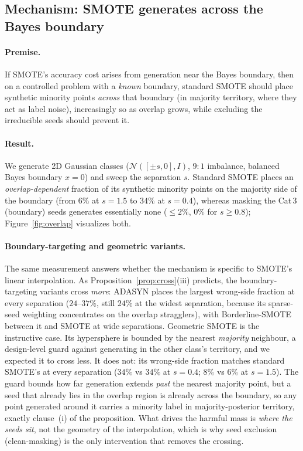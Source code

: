 \subsection{Mechanism: SMOTE generates across the Bayes boundary}\label{sec:results:mechanism}

\paragraph{Premise.} If SMOTE's accuracy cost arises from generation near the
Bayes boundary, then on a controlled problem with a \emph{known} boundary,
standard SMOTE should place synthetic minority points \emph{across} that boundary
(in majority territory, where they act as label noise), increasingly so as
overlap grows, while excluding the irreducible seeds should prevent it.

\paragraph{Result.} We generate 2D Gaussian classes
($\mathcal{N}([\pm s,0], I)$, $9{:}1$ imbalance, balanced Bayes boundary
$x=0$) and sweep the separation $s$. Standard SMOTE places an
\emph{overlap-dependent} fraction of its synthetic minority points on the
majority side of the boundary (from $6\%$ at $s=1.5$ to $34\%$ at $s=0.4$),
whereas masking the Cat\,3 (boundary) seeds generates essentially none
($\le 2\%$, $0\%$ for $s\ge0.8$); Figure~\ref{fig:overlap} visualizes both.

\paragraph{Boundary-targeting and geometric variants.} The same measurement
answers whether the mechanism is specific to SMOTE's linear interpolation. As
Proposition~\ref{prop:cross}(iii) predicts, the boundary-targeting variants
cross \emph{more}: ADASYN places the largest wrong-side fraction at every
separation ($24$--$37\%$, still $24\%$ at the widest separation, because its
sparse-seed weighting concentrates on the overlap stragglers), with
Borderline-SMOTE between it and SMOTE at wide separations. Geometric SMOTE
\cite{douzas2019geometric} is the instructive case. Its hypersphere is
bounded by the nearest \emph{majority} neighbour, a design-level guard against
generating in the other class's territory, and we expected it to cross less.
It does not: its wrong-side fraction matches standard SMOTE's at every
separation ($34\%$ vs $34\%$ at $s{=}0.4$; $8\%$ vs $6\%$ at $s{=}1.5$). The
guard bounds how far generation extends \emph{past} the nearest majority
point, but a seed that already lies in the overlap region is already across
the boundary, so any point generated around it carries a minority label in
majority-posterior territory, exactly clause~(i) of the proposition. What
drives the harmful mass is \emph{where the seeds sit}, not the geometry of the
interpolation, which is why seed exclusion (clean-masking) is the only
intervention that removes the crossing.

